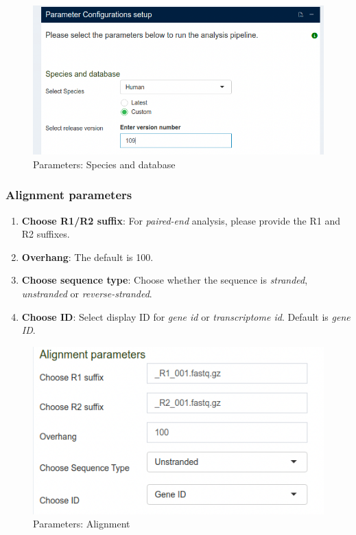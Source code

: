 \documentclass[
  a4paper,
  oneside,
  open=any]{scrreport}
\providecommand{\tightlist}{%
  \setlength{\itemsep}{0pt}\setlength{\parskip}{0pt}}\usepackage{longtable,booktabs,array}
\begin{document}
\begin{figure}[H]

{\centering \includegraphics{./images/transcriptome/transcript5.png}

}

\caption{\label{fig-trans4}Parameters: Species and database}

\end{figure}

\hypertarget{alignment-parameters}{%
\subsubsection{Alignment parameters}\label{alignment-parameters}}

\begin{enumerate}
\def\labelenumi{\arabic{enumi}.}
\tightlist
\item
  \textbf{Choose R1/R2 suffix}: For \emph{paired-end} analysis, please
  provide the R1 and R2 suffixes.
\item
  \textbf{Overhang}: The default is 100.
\item
  \textbf{Choose sequence type}: Choose whether the sequence is
  \emph{stranded}, \emph{unstranded} or \emph{reverse-stranded}.
\item
  \textbf{Choose ID}: Select display ID for \emph{gene id} or
  \emph{transcriptome id}. Default is \emph{gene ID}.
\end{enumerate}

\begin{figure}[H]

{\centering \includegraphics{./images/transcriptome/transcript6.png}

}

\caption{\label{fig-trans5}Parameters: Alignment}

\end{figure}
\end{document}
